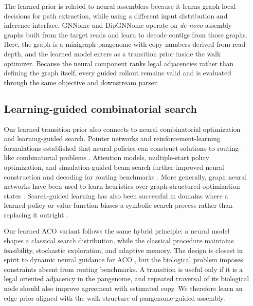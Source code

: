 \documentclass[11pt]{article}
\begin{document}
The learned prior is related to neural assemblers because it learns graph-local decisions for path extraction, while using a different input distribution and inference interface. GNNome and DipGNNome operate on \emph{de novo} assembly graphs built from the target reads and learn to decode contigs from those graphs. Here, the graph is a minigraph pangenome with copy numbers derived from read depth, and the learned model enters as a transition prior inside the walk optimizer. Because the neural component ranks legal adjacencies rather than defining the graph itself, every guided rollout remains valid and is evaluated through the same objective and downstream parser.

\subsection{Learning-guided combinatorial search}

Our learned transition prior also connects to neural combinatorial optimization and learning-guided search. Pointer networks and reinforcement-learning formulations established that neural policies can construct solutions to routing-like combinatorial problems \citep{vinyals2015pointer,bello2017nco}. Attention models, multiple-start policy optimization, and simulation-guided beam search further improved neural construction and decoding for routing benchmarks \citep{kool2019attention,kwon2020pomo,choo2022simulation}. More generally, graph neural networks have been used to learn heuristics over graph-structured optimization states \citep{khalil2017learning,kipf2017gcn,hamilton2017graphsage,velickovic2018gat}. Search-guided learning has also been successful in domains where a learned policy or value function biases a symbolic search process rather than replacing it outright \citep{kocsis2006uct,coulom2006mcts,silver2016alphago,silver2018alphazero,orseau2021phs}.

Our learned ACO variant follows the same hybrid principle: a neural model shapes a classical search distribution, while the classical procedure maintains feasibility, stochastic exploration, and adaptive memory. The design is closest in spirit to dynamic neural guidance for ACO \citep{tran2026dynaco}, but the biological problem imposes constraints absent from routing benchmarks. A transition is useful only if it is a legal oriented adjacency in the pangenome, and repeated traversal of its biological node should also improve agreement with estimated copy. We therefore learn an edge prior aligned with the walk structure of pangenome-guided assembly.
\end{document}
